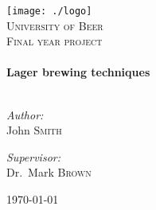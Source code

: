 \begin{titlepage}

\begin{center}


\texttt{[image: ./logo]}\\[1cm]    

\textsc{\LARGE University of Beer}\\[1.5cm]

\textsc{\Large Final year project}\\[0.5cm]


\HRule \\[0.4cm]
{ \huge \bfseries Lager brewing techniques}\\[0.4cm]

\HRule \\[1.5cm]

\begin{minipage}{0.4\textwidth}
\begin{flushleft} \large
\emph{Author:}\\
John \textsc{Smith}
\end{flushleft}
\end{minipage}
\begin{minipage}{0.4\textwidth}
\begin{flushright} \large
\emph{Supervisor:} \\
Dr.~Mark \textsc{Brown}
\end{flushright}
\end{minipage}

\vfill

{\large \today}

\end{center}


\end{titlepage}
